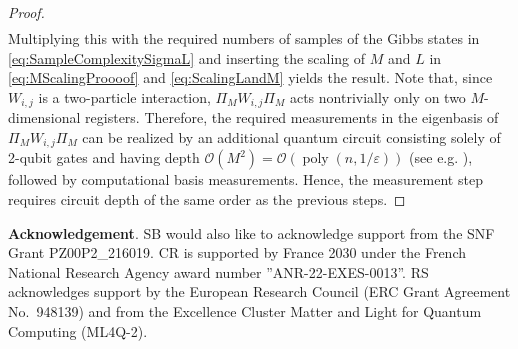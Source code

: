 \documentclass[11pt]{amsart}
\def\smallsection#1{\smallskip\noindent\textbf{#1}.}
\newcommand{\1}{\mathbbm{1}}
\newcommand{\eps}{\varepsilon}
\theoremstyle{plain}
\theoremstyle{definition}
\theoremstyle{remark}
\numberwithin{equation}{section}
\begin{document}
\begin{proof}
\begin{align*}
 \end{align*}
 Multiplying this with the required numbers of samples of the Gibbs states in \eqref{eq:SampleComplexitySigmaL} and inserting the scaling of $M$ and $L$ in \eqref{eq:MScalingProooof} and \eqref{eq:ScalingLandM} yields the result.
Note that, since \(W_{i,j}\) is a two-particle interaction, \(\Pi_M W_{i,j}\Pi_M\) acts nontrivially only on two \(M\)-dimensional registers. Therefore, the required measurements in the eigenbasis of \(\Pi_M W_{i,j}\Pi_M\) can be realized by an additional quantum circuit consisting solely of 2-qubit gates and having depth \(\mathcal{O}(M^2)=\mathcal{O}(\operatorname{poly}(n,1/\eps))\) (see e.g. \cite[Section~4.5.1]{Nielsen_Chuang_2010}), followed by computational basis measurements. Hence, the measurement step requires circuit depth of the same order as the previous steps.



\end{proof}










\smallsection{Acknowledgement}
SB would also like to acknowledge support from the SNF Grant PZ00P2\_216019. 
CR is supported by France 2030 under the
French National Research Agency award number ''ANR-22-EXES-0013''. RS acknowledges support by the European Research Council (ERC Grant Agreement No.~948139) and from the Excellence Cluster Matter and Light for Quantum Computing (ML4Q-2).





\end{document}
